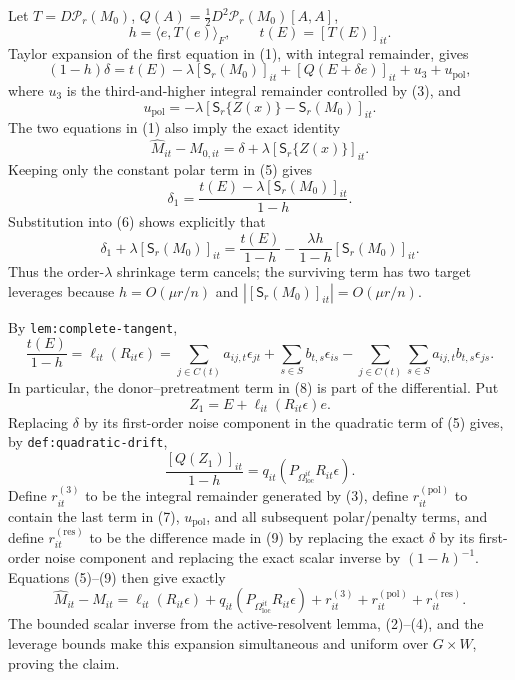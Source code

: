 Let \(T=D\mathcal P_r(M_0)\), \(Q(A)=\tfrac12D^2\mathcal P_r(M_0)[A,A]\),
\[
 h=\langle e,T(e)\rangle_F,
 \qquad t(E)=[T(E)]_{it}.
\]
Taylor expansion of the first equation in (1), with integral remainder, gives
\[
 (1-h)\delta
 =t(E)-\lambda[\mathsf S_r(M_0)]_{it}
   +[Q(E+\delta e)]_{it}+u_3+u_{\mathrm{pol}},
 \tag{5}
\]
where \(u_3\) is the third-and-higher integral remainder controlled by (3), and
\[
 u_{\mathrm{pol}}
 =-\lambda[\mathsf S_r\{Z(x)\}-\mathsf S_r(M_0)]_{it}.
\]
The two equations in (1) also imply the exact identity
\[
 \widehat M_{it}-M_{0,it}
 =\delta+\lambda[\mathsf S_r\{Z(x)\}]_{it}.
 \tag{6}
\]
Keeping only the constant polar term in (5) gives
\[
 \delta_1=\frac{t(E)-\lambda[\mathsf S_r(M_0)]_{it}}{1-h}.
\]
Substitution into (6) shows explicitly that
\[
 \delta_1+\lambda[\mathsf S_r(M_0)]_{it}
 =\frac{t(E)}{1-h}
  -\frac{\lambda h}{1-h}[\mathsf S_r(M_0)]_{it}.
 \tag{7}
\]
Thus the order-\(\lambda\) shrinkage term cancels; the surviving term has two target leverages because \(h=O(\mu r/n)\) and \(|[\mathsf S_r(M_0)]_{it}|=O(\mu r/n)\).

By \texttt{lem:complete-tangent},
\[
 \frac{t(E)}{1-h}=\ell_{it}(R_{it}\epsilon)
 =\sum_{j\in C(t)}a_{ij,t}\epsilon_{jt}
  +\sum_{s\in S}b_{t,s}\epsilon_{is}
  -\sum_{j\in C(t)}\sum_{s\in S}a_{ij,t}b_{t,s}\epsilon_{js}.
 \tag{8}
\]
In particular, the donor--pretreatment term in (8) is part of the differential.  Put
\[
 Z_1=E+\ell_{it}(R_{it}\epsilon)e.
\]
Replacing \(\delta\) by its first-order noise component in the quadratic term of (5) gives, by \texttt{def:quadratic-drift},
\[
 \frac{[Q(Z_1)]_{it}}{1-h}
 =q_{it}(P_{\Omega_{\mathrm{loc}}^{it}}R_{it}\epsilon).
 \tag{9}
\]
Define \(r^{(3)}_{it}\) to be the integral remainder generated by (3), define \(r^{(\mathrm{pol})}_{it}\) to contain the last term in (7), \(u_{\mathrm{pol}}\), and all subsequent polar/penalty terms, and define \(r^{(\mathrm{res})}_{it}\) to be the difference made in (9) by replacing the exact \(\delta\) by its first-order noise component and replacing the exact scalar inverse by \((1-h)^{-1}\).  Equations (5)--(9) then give exactly
\[
 \widehat M_{it}-M_{it}
 =\ell_{it}(R_{it}\epsilon)
  +q_{it}(P_{\Omega_{\mathrm{loc}}^{it}}R_{it}\epsilon)
  +r^{(3)}_{it}+r^{(\mathrm{pol})}_{it}+r^{(\mathrm{res})}_{it}.
\]
The bounded scalar inverse from the active-resolvent lemma, (2)--(4), and the leverage bounds make this expansion simultaneous and uniform over \(G\times W\), proving the claim.

